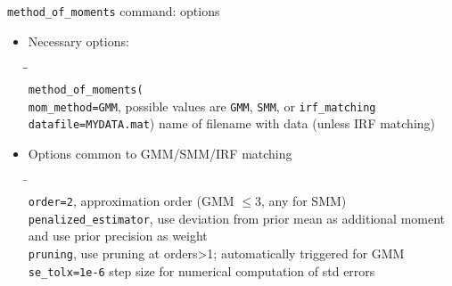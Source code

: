 \begin{frame}{\texttt{method\_of\_moments} command: options}

  \begin{itemize}
    \item Necessary options:
          \begin{tabbing}
            \=\hspace*{5cm}\= \hspace*{5cm}\\
            \>\texttt{method\_of\_moments(}\\
            \>\texttt{mom\_method=GMM}, \>possible values are \texttt{GMM}, \texttt{SMM}, or \texttt{irf\_matching}\\
            \>\texttt{datafile=\textquotesingle MYDATA.mat\textquotesingle})  \>name of filename with data (unless IRF matching)
          \end{tabbing}
  \end{itemize}

  \begin{itemize}
    \item Options common to GMM/SMM/IRF matching
          \begin{tabbing}
            \=\hspace*{5cm}\= \\
            \>\texttt{order=2}, \> approximation order (GMM $\leq3$, any for SMM)\\
            \>\texttt{penalized\_estimator},  \>use deviation from prior mean as additional moment\\
            \> \>and use prior precision as weight\\
            \>\texttt{pruning},           \> use pruning at orders\textgreater1; automatically triggered for GMM\\
            \>\texttt{se\_tolx=1e-6}     \> step size for numerical computation of std errors
          \end{tabbing}
  \end{itemize}
\end{frame}


